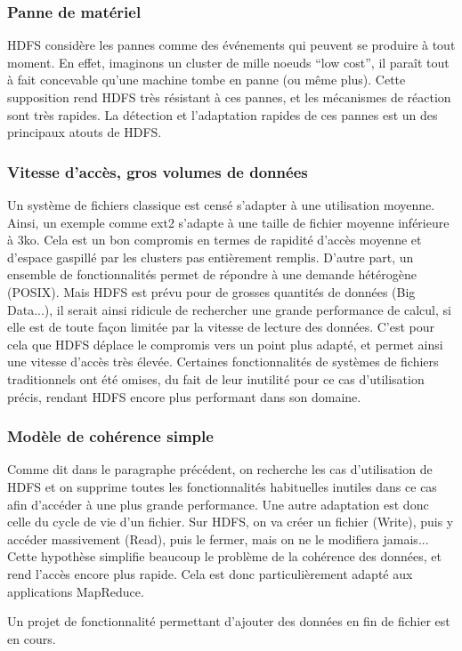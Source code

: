\subsubsection{Panne de matériel}
\label{sec:panne-de-materiel}

\par HDFS considère les pannes comme des événements qui peuvent se produire à tout moment. En effet, imaginons un cluster de mille noeuds ``low cost'', il paraît tout à fait concevable  qu'une machine tombe en panne (ou même plus). Cette supposition rend HDFS très résistant à ces pannes, et les mécanismes de réaction sont très rapides. La détection et l'adaptation rapides de ces pannes est un des principaux atouts de HDFS.

\subsubsection{Vitesse d'accès, gros volumes de données}
\label{sec:vitesse-dacces-aux}

\par Un système de fichiers classique est censé s'adapter à une utilisation moyenne. Ainsi, un exemple comme ext2 s'adapte à une taille de fichier moyenne inférieure à 3ko. Cela est un bon compromis en termes de rapidité d'accès moyenne et d'espace gaspillé par les clusters pas entièrement remplis. D'autre part, un ensemble de fonctionnalités permet de répondre à une demande hétérogène (POSIX).  Mais HDFS est prévu pour de grosses quantités de données (Big Data...), il serait ainsi ridicule de rechercher une grande performance de calcul, si elle est de toute façon limitée par la vitesse de lecture des données. C'est pour cela que HDFS déplace le compromis vers un point plus adapté, et permet ainsi une vitesse d'accès très élevée. Certaines fonctionnalités de systèmes de fichiers traditionnels ont été omises, du fait de leur inutilité pour ce cas d'utilisation précis, rendant HDFS encore plus performant dans son domaine.

\subsubsection{Modèle de cohérence simple}
\label{sec:modele-de-coherence}

\par Comme dit dans le paragraphe précédent, on recherche les cas d'utilisation de HDFS et on supprime toutes les fonctionnalités habituelles inutiles dans ce cas afin d'accéder à une plus grande performance. Une autre adaptation est donc celle du cycle de vie d'un fichier. Sur HDFS, on va créer un fichier (Write), puis y accéder massivement (Read), puis le fermer, mais on ne le modifiera jamais... Cette hypothèse simplifie beaucoup le problème de la cohérence des données, et rend l'accès encore plus rapide. Cela est donc particulièrement adapté aux applications MapReduce.
\par Un projet de fonctionnalité permettant d'ajouter des données en fin de fichier est en cours.

